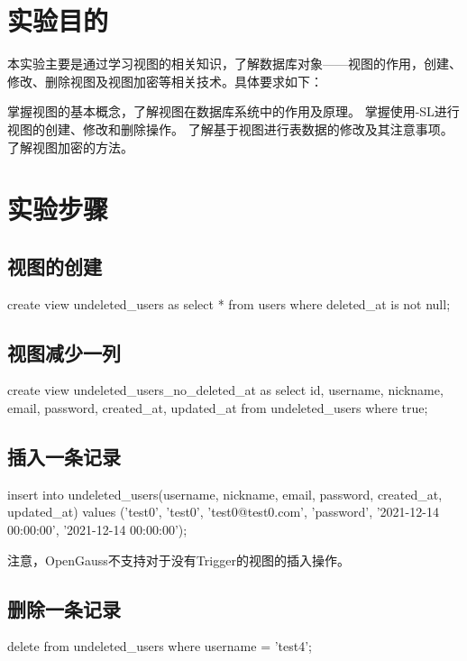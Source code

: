 \documentclass{ctexrep}
\begin{document}
\section{实验目的}
本实验主要是通过学习视图的相关知识，了解数据库对象——视图的作用，创建、修改、删除视图及视图加密等相关技术。具体要求如下：
\begin{outline}[enumerate]
    \1 掌握视图的基本概念，了解视图在数据库系统中的作用及原理。
    \1 掌握使用-SL进行视图的创建、修改和删除操作。
    \1 了解基于视图进行表数据的修改及其注意事项。
    \1 了解视图加密的方法。
\end{outline}
\section{实验步骤}
\subsection{视图的创建}
\begin{run}
    create view undeleted_users as select * from users where deleted_at is not null;
\end{run}
\subsection{视图减少一列}
\begin{run}
    create view undeleted_users_no_deleted_at as select id, username, nickname, email, password, created_at, updated_at from undeleted_users where true;
\end{run}
\subsection{插入一条记录}
\begin{run}
    insert into undeleted_users(username, nickname, email, password,  created_at, updated_at)
    values ('test0', 'test0', 'test0@test0.com', 'password',  '2021-12-14 00:00:00', '2021-12-14 00:00:00');
\end{run}

注意，OpenGauss不支持对于没有Trigger的视图的插入操作。

\subsection{删除一条记录}
\begin{run}
    delete from undeleted_users where username = 'test4';
\end{run}
\end{document}
